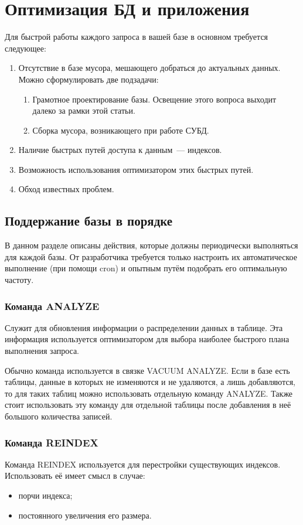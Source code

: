 \section{Оптимизация БД и приложения}
Для быстрой работы каждого запроса в вашей базе в основном требуется следующее:
\begin{enumerate}
 \item Отсутствие в базе мусора, мешающего добраться до актуальных данных. Можно сформулировать две подзадачи:
 \begin{enumerate}
  \item Грамотное проектирование базы. Освещение этого вопроса выходит далеко за рамки этой статьи.
  \item Сборка мусора, возникающего при работе СУБД.
 \end{enumerate}
 \item Наличие быстрых путей доступа к данным~--- индексов.
 \item Возможность использования оптимизатором этих быстрых путей.
 \item Обход известных проблем.
\end{enumerate}

\subsection{Поддержание базы в порядке}
В данном разделе описаны действия, которые должны периодически выполняться для каждой базы. От разработчика требуется только настроить 
их автоматическое выполнение (при помощи cron) и опытным путём подобрать его оптимальную частоту.

\subsubsection{Команда ANALYZE}
Служит для обновления информации о распределении данных в таблице. Эта информация используется оптимизатором для выбора наиболее 
быстрого плана выполнения запроса.

Обычно команда используется в связке VACUUM ANALYZE. Если в базе есть таблицы, данные в которых не изменяются и не удаляются, а лишь 
добавляются, то для таких таблиц можно использовать отдельную команду ANALYZE. Также стоит использовать эту команду для отдельной 
таблицы после добавления в неё большого количества записей.

\subsubsection{Команда REINDEX}
Команда REINDEX используется для перестройки существующих индексов.
Использовать её имеет смысл в случае:
\begin{itemize}
\item порчи индекса;
\item постоянного увеличения его размера.
\end{itemize}

